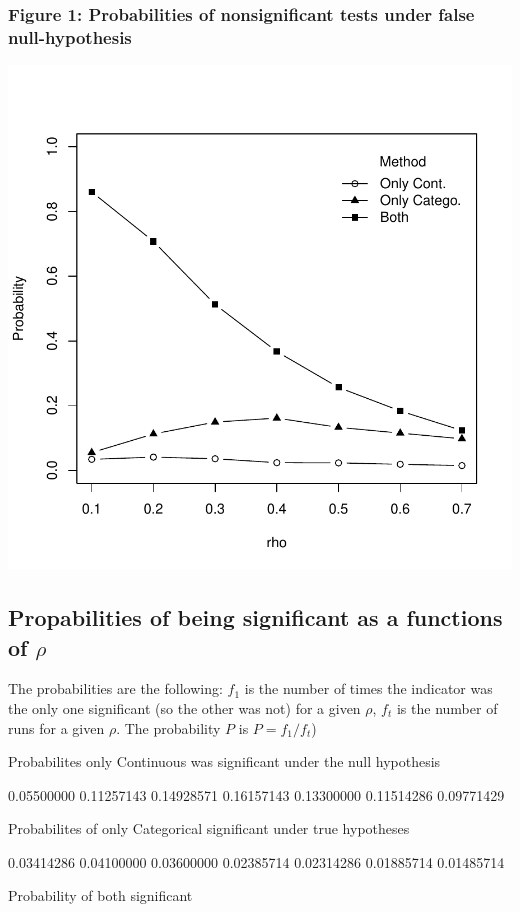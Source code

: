 \documentclass{article}
\begin{document}
\subsubsection*{Figure 1: Probabilities of nonsignificant tests under false null-hypothesis}

\includegraphics{probabilities4-dd}



\subsection*{Propabilities of being significant as a functions of \(\rho\)}

The probabilities are the following: \(f_1\) is the number of times the indicator was the only one significant (so the other was not) for a given \(\rho\), \(f_t\) is the number of runs for a given \(\rho\). The probability \(P\) is \(P=f_1 / f_t \))  

\begin{Schunk}
\begin{Soutput}
Probabilites only Continuous was significant under the null hypothesis
\end{Soutput}
\begin{Soutput}
[1] 0.05500000 0.11257143 0.14928571 0.16157143 0.13300000 0.11514286 0.09771429
\end{Soutput}
\begin{Soutput}
Probabilites of only Categorical significant under true hypotheses
\end{Soutput}
\begin{Soutput}
[1] 0.03414286 0.04100000 0.03600000 0.02385714 0.02314286 0.01885714 0.01485714
\end{Soutput}
\begin{Soutput}
Probability of  both  significant
\end{Soutput}
\end{Schunk}
\end{document}
